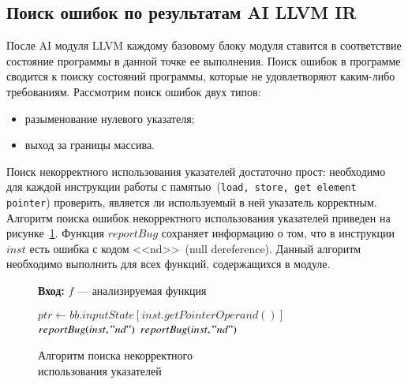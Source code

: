 \subsection{Поиск ошибок по результатам AI LLVM IR}
После AI модуля LLVM каждому базовому блоку модуля ставится в соответствие
состояние программы в данной точке ее выполнения. Поиск ошибок в программе
сводится к поиску состояний программы, которые не удовлетворяют каким-либо
требованиям. Рассмотрим поиск ошибок двух типов:
\begin{itemize}
\item разыменование нулевого указателя;
\item выход за границы массива.
\end{itemize}

Поиск некорректного использования указателей достаточно прост: необходимо для
каждой инструкции работы с памятью~(\texttt{load, store, get element pointer}) проверить, 
является ли используемый в ней указатель корректным. Алгоритм поиска ошибок
некорректного использования указателей приведен на 
рисунке~\ref{image:ndChecker}. Функция $reportBug$ сохраняет информацию
о том, что в инструкции $inst$ есть ошибка с кодом <<nd>>~(null dereference). 
Данный алгоритм необходимо выполнить для всех функций, содержащихся в модуле.
\begin{figure}[h!]
\textbf{Вход:} $f$ --- анализируемая функция

\begin{algorithmic}[1]
            \State $ptr \gets bb.inputState[inst.getPointerOperand()]$
                \State $reportBug(inst, "nd")$
                \State $reportBug(inst, "nd")$
            \EndIf
        \EndIf
    \EndFor
\EndFor
\end{algorithmic}
\caption{Алгоритм поиска некорректного\\использования указателей}
\label{image:ndChecker}
\end{figure}

